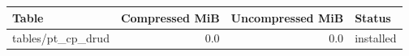 {\small
\begin{tabular}{lrrl}
\hline
Table & Compressed MiB & Uncompressed MiB & Status \\
\hline
tables/pt\_cp\_drud & 0.0 & 0.0 & installed \\
\hline
\end{tabular}
}
